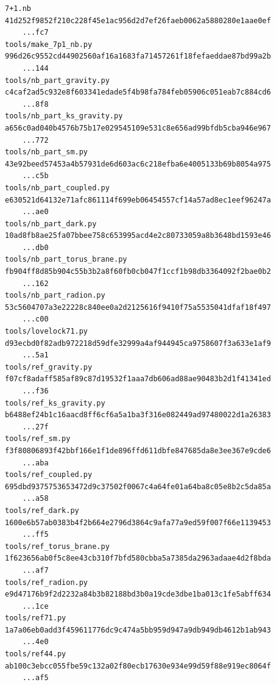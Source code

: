 \documentclass[10pt,a4paper]{article}
\begin{document}
\begin{Verbatim}[fontsize=\small,frame=single,framesep=2mm]
7+1.nb                             41d252f9852f210c228f45e1ac956d2d7ef26faeb0062a5880280e1aae0ef
    ...fc7
tools/make_7p1_nb.py               996d26c9552cd44902560af16a1683fa71457261f18fefaeddae87bd99a2b
    ...144
tools/nb_part_gravity.py           c4caf2ad5c932e8f603341edade5f4b98fa784feb05906c051eab7c884cd6
    ...8f8
tools/nb_part_ks_gravity.py        a656c0ad040b4576b75b17e029545109e531c8e656ad99bfdb5cba946e967
    ...772
tools/nb_part_sm.py                43e92beed57453a4b57931de6d603ac6c218efba6e4005133b69b8054a975
    ...c5b
tools/nb_part_coupled.py           e630521d64132e71afc861114f699eb06454557cf14a57ad8ec1eef96247a
    ...ae0
tools/nb_part_dark.py              10ad8fb8ae25fa07bbee758c653995acd4e2c80733059a8b3648bd1593e46
    ...db0
tools/nb_part_torus_brane.py       fb904ff8d85b904c55b3b2a8f60fb0cb047f1ccf1b98db3364092f2bae0b2
    ...162
tools/nb_part_radion.py            53c5604707a3e22228c840ee0a2d2125616f9410f75a5535041dfaf18f497
    ...c00
tools/lovelock71.py                d93ecbd0f82adb972218d59dfe32999a4af944945ca9758607f3a633e1af9
    ...5a1
tools/ref_gravity.py               f07cf8adaff585af89c87d19532f1aaa7db606ad88ae90483b2d1f41341ed
    ...f36
tools/ref_ks_gravity.py            b6488ef24b1c16aacd8ff6cf6a5a1ba3f316e082449ad97480022d1a26383
    ...27f
tools/ref_sm.py                    f3f80806893f42bbf166e1f1de896ffd611dbfe847685da8e3ee367e9cde6
    ...aba
tools/ref_coupled.py               695dbd9375753653472d9c37502f0067c4a64fe01a64ba8c05e8b2c5da85a
    ...a58
tools/ref_dark.py                  1600e6b57ab0383b4f2b664e2796d3864c9afa77a9ed59f007f66e1139453
    ...ff5
tools/ref_torus_brane.py           1f623656ab0f5c8ee43cb310f7bfd580cbba5a7385da2963adaae4d2f8bda
    ...af7
tools/ref_radion.py                e9d47176b9f2d2232a84b3b82188bd3b0a19cde3dbe1ba013c1fe5abff634
    ...1ce
tools/ref71.py                     1a7a06eb0add3f459611776dc9c474a5bb959d947a9db949db4612b1ab943
    ...4e0
tools/ref44.py                     ab100c3ebcc055fbe59c132a02f80ecb17630e934e99d59f88e919ec8064f
    ...af5
\end{Verbatim}
\end{document}

